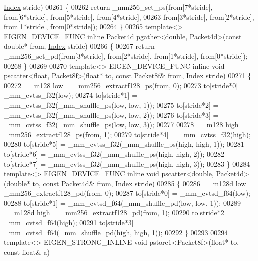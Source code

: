 \begin{DoxyCode}
{{      \hyperlink{namespace_eigen_a62e77e0933482dafde8fe197d9a2cfde}{Index} stride)
00261 \{
00262   \textcolor{keywordflow}{return} \_mm256\_set\_ps(from[7*stride], from[6*stride], from[5*stride], from[4*stride],
00263                        from[3*stride], from[2*stride], from[1*stride], from[0*stride]);
00264 \}
00265 \textcolor{keyword}{template}<> EIGEN\_DEVICE\_FUNC \textcolor{keyword}{inline} Packet4d pgather<double, Packet4d>(\textcolor{keyword}{const} \textcolor{keywordtype}{double}* from, 
      \hyperlink{namespace_eigen_a62e77e0933482dafde8fe197d9a2cfde}{Index} stride)
00266 \{
00267   \textcolor{keywordflow}{return} \_mm256\_set\_pd(from[3*stride], from[2*stride], from[1*stride], from[0*stride]);
00268 \}
00269 
00270 \textcolor{keyword}{template}<> EIGEN\_DEVICE\_FUNC \textcolor{keyword}{inline} \textcolor{keywordtype}{void} pscatter<float, Packet8f>(\textcolor{keywordtype}{float}* to, \textcolor{keyword}{const} Packet8f& from, 
      \hyperlink{namespace_eigen_a62e77e0933482dafde8fe197d9a2cfde}{Index} stride)
00271 \{
00272   \_\_m128 low = \_mm256\_extractf128\_ps(from, 0);
00273   to[stride*0] = \_mm\_cvtss\_f32(low);
00274   to[stride*1] = \_mm\_cvtss\_f32(\_mm\_shuffle\_ps(low, low, 1));
00275   to[stride*2] = \_mm\_cvtss\_f32(\_mm\_shuffle\_ps(low, low, 2));
00276   to[stride*3] = \_mm\_cvtss\_f32(\_mm\_shuffle\_ps(low, low, 3));
00277 
00278   \_\_m128 high = \_mm256\_extractf128\_ps(from, 1);
00279   to[stride*4] = \_mm\_cvtss\_f32(high);
00280   to[stride*5] = \_mm\_cvtss\_f32(\_mm\_shuffle\_ps(high, high, 1));
00281   to[stride*6] = \_mm\_cvtss\_f32(\_mm\_shuffle\_ps(high, high, 2));
00282   to[stride*7] = \_mm\_cvtss\_f32(\_mm\_shuffle\_ps(high, high, 3));
00283 \}
00284 \textcolor{keyword}{template}<> EIGEN\_DEVICE\_FUNC \textcolor{keyword}{inline} \textcolor{keywordtype}{void} pscatter<double, Packet4d>(\textcolor{keywordtype}{double}* to, \textcolor{keyword}{const} Packet4d& from, 
      \hyperlink{namespace_eigen_a62e77e0933482dafde8fe197d9a2cfde}{Index} stride)
00285 \{
00286   \_\_m128d low = \_mm256\_extractf128\_pd(from, 0);
00287   to[stride*0] = \_mm\_cvtsd\_f64(low);
00288   to[stride*1] = \_mm\_cvtsd\_f64(\_mm\_shuffle\_pd(low, low, 1));
00289   \_\_m128d high = \_mm256\_extractf128\_pd(from, 1);
00290   to[stride*2] = \_mm\_cvtsd\_f64(high);
00291   to[stride*3] = \_mm\_cvtsd\_f64(\_mm\_shuffle\_pd(high, high, 1));
00292 \}
00293 
00294 \textcolor{keyword}{template}<> EIGEN\_STRONG\_INLINE \textcolor{keywordtype}{void} pstore1<Packet8f>(\textcolor{keywordtype}{float}* to, \textcolor{keyword}{const} \textcolor{keywordtype}{float}& a)
}}
\end{DoxyCode}
